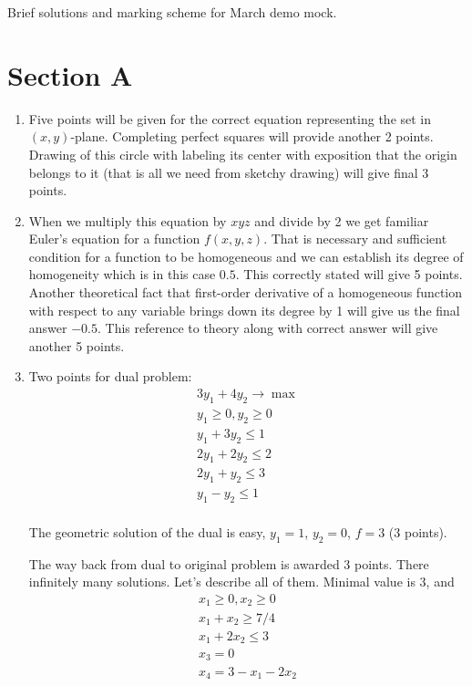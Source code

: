 \documentclass[12pt]{article} %
\theoremstyle{definition} %
\begin{document}
Brief solutions and marking scheme for March demo mock.



\section*{Section A}


\begin{enumerate}

\item Five points will be given for the correct equation representing the set in $(x, y)$-plane. 
Completing perfect squares will provide another 2 points. 
Drawing of this circle with labeling its center with exposition that the origin belongs to it 
(that is all we need from sketchy drawing) will give final 3 points.

\item When we multiply this equation by $xyz$ and divide by 2 we get 
familiar Euler’s equation for a function $f(x, y, z)$. 
That is necessary and sufficient condition for a function to be homogeneous and 
we can establish its degree of homogeneity which is in this case $0.5$. 
This correctly stated will give 5 points. 
Another theoretical fact that first-order derivative of a homogeneous function 
with respect to any variable brings down its degree by 1 will give us the final answer $-0.5$. 
This reference to theory along with correct answer will give another 5 points.

\item Two points for dual problem:
\begin{align*}
3y_1 + 4y_2 \to \max  \\ 
y_1 \geq 0, y_2 \geq 0 \\
y_1 + 3y_2 \leq 1 \\
2y_1 + 2y_2 \leq 2 \\
2y_1 + y_2 \leq 3 \\
y_1 - y_2 \leq 1 \\
\end{align*}

The geometric solution of the dual is easy, $y_1 = 1$, $y_2 = 0$, $f = 3$ (3 points).

The way back from dual to original problem is awarded 3 points. 
There infinitely many solutions. Let's describe all of them. 
Minimal value is 3, and
\begin{align*}
x_1 \geq 0, x_2 \geq 0 \\
x_1 + x_2 \geq 7/4 \\
x_1 + 2x_2 \leq 3 \\  
x_3 = 0 \\
x_4 = 3 - x_1 - 2x_2 \\
\end{align*}


\end{enumerate}
\end{document}

